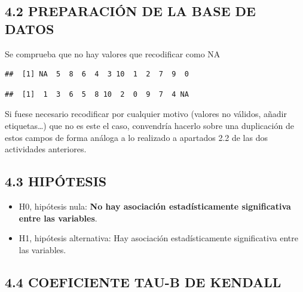 \documentclass[
  12 pt,
  a4paper,
]{article}
\newenvironment{Shaded}{\begin{snugshade}}{\end{snugshade}}
\newcommand{\FunctionTok}[1]{\textcolor[rgb]{0.13,0.29,0.53}{\textbf{#1}}}
\newcommand{\NormalTok}[1]{#1}
\newcommand{\SpecialCharTok}[1]{\textcolor[rgb]{0.81,0.36,0.00}{\textbf{#1}}}
\providecommand{\tightlist}{%
  \setlength{\itemsep}{0pt}\setlength{\parskip}{0pt}}
\begin{document}
\subsection{4.2 PREPARACIÓN DE LA BASE DE
DATOS}\label{preparaciuxf3n-de-la-base-de-datos-2}

Se comprueba que no hay valores que recodificar como NA

\begin{Shaded}
\end{Shaded}

\begin{verbatim}
##  [1] NA  5  8  6  4  3 10  1  2  7  9  0
\end{verbatim}

\begin{Shaded}
\end{Shaded}

\begin{verbatim}
##  [1]  1  3  6  5  8 10  2  0  9  7  4 NA
\end{verbatim}

Si fuese necesario recodificar por cualquier motivo (valores no válidos,
añadir etiquetas\ldots) que no es este el caso, convendría hacerlo sobre
una duplicación de estos campos de forma análoga a lo realizado a
apartados 2.2 de las dos actividades anteriores.

\subsection{4.3 HIPÓTESIS}\label{hipuxf3tesis-2}

\begin{itemize}
\tightlist
\item
  H0, hipótesis nula: \textbf{No hay asociación estadísticamente
  significativa entre las variables}.
\item
  H1, hipótesis alternativa: Hay asociación estadísticamente
  significativa entre las variables.
\end{itemize}

\subsection{4.4 COEFICIENTE TAU-B DE
KENDALL}\label{coeficiente-tau-b-de-kendall}
\end{document}
